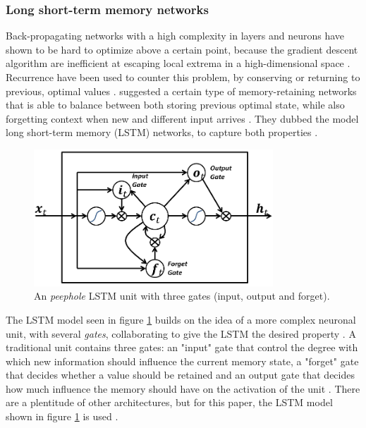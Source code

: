\documentclass[a4paper]{article}
\begin{document}
\subsubsection{Long short-term memory networks}
Back-propagating networks with a high complexity in layers and neurons have
shown to be hard to optimize above a certain point, because the gradient
descent algorithm are inefficient at escaping local extrema in a high-dimensional
space \citep{Russell2009}. Recurrence have been used to counter this problem,
by conserving \emdash or returning to \emdash previous, optimal values
\citep{Schmidhuber2015, Russell2009}. \cite{Hochreiter1997} suggested a certain
type of memory-retaining networks that is able to balance between both
storing previous optimal state, while also forgetting context when new and
different input arrives \citep{Hochreiter1997, Schmidhuber2015}.
They dubbed the model long short-term memory (LSTM) networks, to capture both
properties \citep{Hochreiter1997}.

\begin{figure}
  \centering
  \includegraphics[width=0.8\textwidth]{lstm.png}
  \caption{An \textit{peephole} LSTM unit with three gates (input, output and forget).}
  \label{fig:lstm}
\end{figure}

The LSTM model seen in figure \ref{fig:lstm} builds on the idea of a more
complex neuronal unit, with several \textit{gates}, collaborating to give
the LSTM the desired property \citep{Gers2001}. A traditional unit contains
three gates: an "input" gate that control the degree with which new information
should influence the current memory state, a "forget" gate that decides whether
a value should be retained and an output gate that decides how much influence
the memory should have on the activation of the unit \citep{Hochreiter1997, Gers2001}.
There are a plentitude of other architectures, but for this paper, the LSTM
model shown in figure \ref{fig:lstm} is used \citep{Gers2001}.
\end{document}
